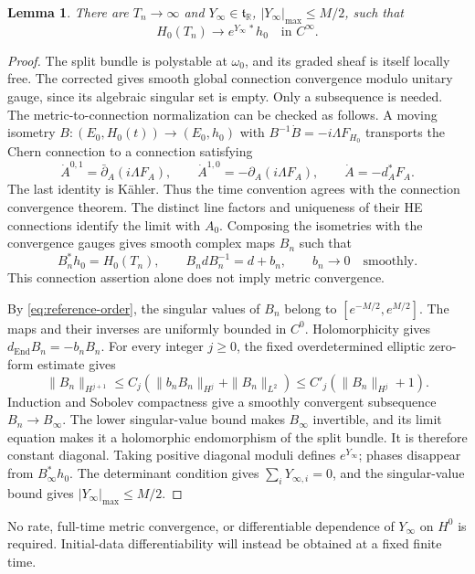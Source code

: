 \documentclass[11pt]{amsart}
\newtheorem{lemma}[theorem]{Lemma}
\theoremstyle{definition}
\theoremstyle{remark}
\newcommand{\RR}{\mathbb R}
\newcommand{\End}{\operatorname{End}}
\begin{document}
\begin{lemma}\label{lem:split-metric-limit}
There are $T_n\to\infty$ and $Y_\infty\in\mathfrak t_{\RR}$,
$|Y_\infty|_{\max}\le M/2$, such that
\[
 H_0(T_n)\longrightarrow e^{Y_\infty\,*}h_0
       \quad\text{in }C^\infty.
\]
\end{lemma}
\begin{proof}
The split bundle is polystable at $\omega_0$, and its graded
sheaf is itself locally free. The corrected
\cite[Theorem 1.1(2)]{SibleyWentworth15} gives smooth global
connection convergence modulo unitary gauge, since its algebraic
singular set is empty. Only a subsequence is needed.
The metric-to-connection normalization can be checked as follows.
A moving isometry $B:(E_0,H_0(t))\to(E_0,h_0)$ with
$B^{-1}\dot B=-i\Lambda F_{H_0}$ transports the Chern connection
to a connection satisfying
\[
 \dot A^{0,1}=\bar\partial_A(i\Lambda F_A),\qquad
 \dot A^{1,0}=-\partial_A(i\Lambda F_A),\qquad
 \dot A=-d_A^*F_A.
\]
The last identity is K\"ahler. Thus the time convention agrees
with the connection convergence theorem. The distinct line
factors and uniqueness of their HE connections identify the
limit with $A_0$. Composing the isometries with the convergence
gauges gives smooth complex maps $B_n$ such that
\begin{equation}\label{eq:reference-gauges}
 B_n^*h_0=H_0(T_n),\qquad
 B_ndB_n^{-1}=d+b_n,\qquad b_n\longrightarrow0
       \quad\text{smoothly}.
\end{equation}
This connection assertion alone does not imply metric convergence.

By \eqref{eq:reference-order}, the singular values of $B_n$
belong to $[e^{-M/2},e^{M/2}]$. The maps and their inverses are
uniformly bounded in $C^0$. Holomorphicity gives
$d_{\End}B_n=-b_nB_n$. For every integer $j\ge0$, the fixed
overdetermined elliptic zero-form estimate gives
\[
 \|B_n\|_{H^{j+1}}
 \le C_j(\|b_nB_n\|_{H^j}+\|B_n\|_{L^2})
 \le C'_j(\|B_n\|_{H^j}+1).
\]
Induction and Sobolev compactness give a smoothly convergent
subsequence $B_n\to B_\infty$. The lower singular-value bound
makes $B_\infty$ invertible, and its limit equation makes it
a holomorphic endomorphism of the split bundle. It is therefore
constant diagonal. Taking positive diagonal moduli defines
$e^{Y_\infty}$; phases disappear from $B_\infty^*h_0$.
The determinant condition gives $\sum_iY_{\infty,i}=0$,
and the singular-value bound gives $|Y_\infty|_{\max}\le M/2$.
\end{proof}

No rate, full-time metric convergence, or differentiable dependence
of $Y_\infty$ on $H^0$ is required. Initial-data differentiability
will instead be obtained at a fixed finite time.
\end{document}
